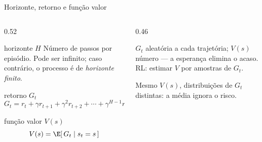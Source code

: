 \documentclass[aspectratio=169, 11pt]{beamer}
\begin{document}
\begin{frame}{Horizonte, retorno e função valor}
  \begin{columns}[T]
    \begin{column}{0.52\textwidth}
      \begin{defbox}[fontupper=\small]{horizonte $H$}
        Número de passos por episódio. Pode ser infinito; caso contrário, o processo é
        de \emph{horizonte finito}.
      \end{defbox}
      \begin{defbox}[fontupper=\small]{retorno $G_t$}
        \vspace{-1.1em}
        \[
          G_t = r_t + \gamma r_{t+1} + \gamma^2 r_{t+2} + \cdots + \gamma^{H-1} r_{t+H-1}
        \]
        \vspace{-1.6em}
      \end{defbox}
      \begin{defbox}[fontupper=\small]{função valor $V(s)$}
        \vspace{-1.1em}
        \[ V(s) = \E[\, G_t \mid s_t = s \,] \]
        \vspace{-1.6em}
      \end{defbox}
    \end{column}
    \begin{column}{0.46\textwidth}
      \begin{ideiabox}
        $G_t$ \alert{aleatória} a cada trajetória; $V(s)$ \alert{número} --- a esperança
        elimina o acaso. RL: estimar $V$ por amostras de $G_t$.
      \end{ideiabox}
      \begin{alertabox}
        Mesmo $V(s)$, distribuições de $G_t$ distintas: a média ignora o risco.
      \end{alertabox}
    \end{column}
  \end{columns}
\end{frame}
\end{document}
